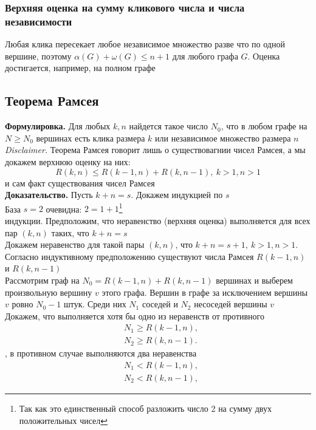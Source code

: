 \documentclass[a4paper]{article}
\begin{document}
\subsubsection*{Верхняя оценка на сумму кликового числа и числа независимости}
Любая клика пересекает любое независимое множество разве что по одной вершине, поэтому $\alpha(G)+\omega(G)\leqslant n+1$ для любого графа $G$. Оценка достигается, например, на полном графе


\subsection{Теорема Рамсея}
\textbf{Формулировка.} Для любых $k,n$ найдется такое число $N_0$, что в любом графе на $N\geqslant N_0$ вершинах есть клика размера $k$ или независимое множество размера $n$\\[2mm]
\indent\textit{Disclaimer.} Теорема Рамсея говорит лишь о существовагнии чисел Рамсея, а мы докажем верхнюю оценку на них: $$R(k,n)\leqslant R(k-1,n)+R(k,n-1),\ k>1,n>1$$ и сам факт существования чисел Рамсея\\[2mm]
\indent\textbf{Доказательство.} Пусть $k+n=s$. Докажем индукцией по $s$\\[2mm]
\indent База $s=2$ очевидна: $2=1+1$\footnote{Так как это единственный способ разложить число 2 на сумму двух положительных чисел}\\[2mm]
 индукции. Предположим, что неравенство (верхняя оценка) выполняется для всех пар $(k,n)$ таких, что $k+n=s$\\[2mm]
\indent Докажем неравенство для такой пары $(k,n)$, что $k+n=s+1,\ k>1,n>1$. Согласно индуктивному предположению существуют числа Рамсея $R(k-1,n)$ и $R(k,n-1)$\\[2mm]
\indent Рассмотрим граф на $N_0=R(k-1, n)+R(k, n-1)$ вершинах и выберем произвольную вершину $v$ этого графа. Вершин в графе за исключением вершины $v$ ровно $N_0-1$ штук. Среди них $N_1$ соседей и $N_2$ несоседей вершины $v$\\[2mm]
\indent Докажем, что выполняется хотя бы одно из неравенств от противного
$$\begin{aligned}
& N_1 \geqslant R(k-1, n), \\
& N_2 \geqslant R(k, n-1) .
\end{aligned}$$
, в противном случае выполняются два неравенства
$$\begin{aligned}
& N_1<R(k-1, n), \\
& N_2<R(k, n-1),
\end{aligned}$$
\end{document}
